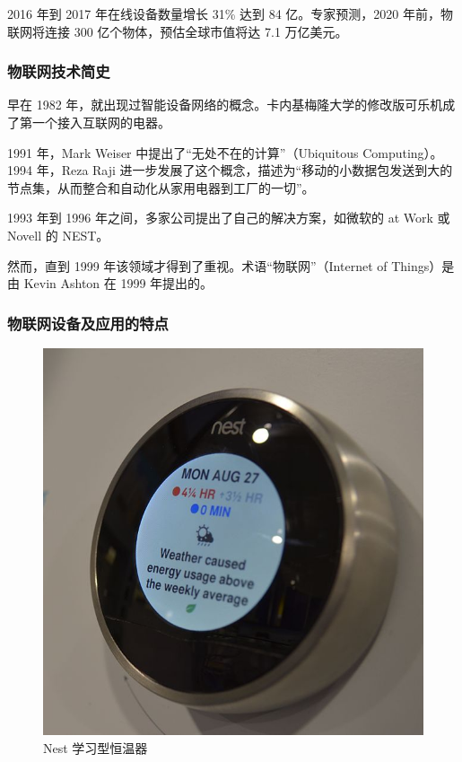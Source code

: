 \documentclass{ctexart}
\begin{document}
2016 年到 2017 年在线设备数量增长 31\% 达到 84 亿。专家预测，2020 年前，物联网将连接 300 亿个物体，预估全球市值将达 7.1 万亿美元。

\subsubsection{物联网技术简史}

早在 1982 年，就出现过智能设备网络的概念。卡内基梅隆大学的修改版可乐机成了第一个接入互联网的电器。

1991 年，Mark Weiser 中提出了“无处不在的计算”（Ubiquitous Computing）。1994 年，Reza Raji 进一步发展了这个概念，描述为“移动的小数据包发送到大的节点集，从而整合和自动化从家用电器到工厂的一切”。

1993 年到 1996 年之间，多家公司提出了自己的解决方案，如微软的 at Work 或 Novell 的 NEST。

然而，直到 1999 年该领域才得到了重视。术语“物联网”（Internet of Things）是由 Kevin Ashton 在 1999 年提出的。

\subsubsection{物联网设备及应用的特点}

\begin{figure}
	\centering
	\includegraphics[scale=1.0]{Nest_Learning_Thermostat.jpg}
	\caption{Nest 学习型恒温器}
\end{figure}
\end{document}
